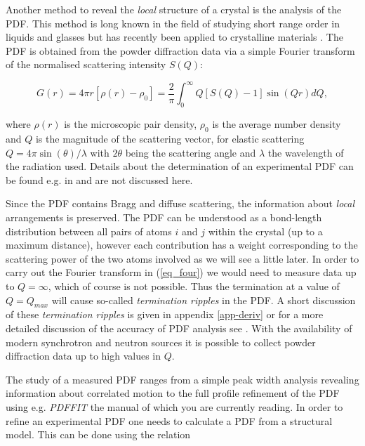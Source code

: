Another method to reveal the {\it local} structure of a crystal is
the analysis of the PDF. This method is long known in the field of
studying short range order in liquids and glasses but has recently
been applied to crystalline materials \citep{egami;lsfd98,bieg93}.
The PDF is obtained from the powder diffraction data via a simple
Fourier transform of the normalised scattering intensity $S(Q)$:

\begin{equation}
  G(r) = 4 \pi r [ \rho(r) - \rho_{0} ] =
         \frac{2}{\pi} \int_{0}^{\infty} Q [S(Q) - 1] \sin(Qr) dQ,
  \label{eq_four}
\end{equation}

\noindent where $\rho(r)$ is the microscopic pair density,
$\rho_{0}$ is the average number density and $Q$ is the magnitude
of the scattering vector, for elastic scattering $Q=4\pi \sin
(\theta) / \lambda$ with $2\theta$ being the scattering angle and
$\lambda$ the wavelength of the radiation used. Details about the
determination of an experimental PDF can be found e.g. in
\citet{egami;lsfd98,warren} and are not discussed here. \par

Since the PDF contains Bragg and diffuse scattering, the
information about {\it local} arrangements is preserved. The PDF
can be understood as a bond-length distribution between all pairs
of atoms $i$ and $j$ within the crystal (up to a maximum
distance), however each contribution has a weight corresponding to
the scattering power of the two atoms involved as we will see a
little later. In order to carry out the Fourier transform in
(\ref{eq_four}) we would need to measure data up to $Q=\infty$,
which of course is not possible. Thus the termination at a value
of $Q=Q_{max}$ will cause so-called {\it termination ripples} in
the PDF. A short discussion of these {\it termination ripples} is
given in appendix \ref{app-deriv} or for a more detailed
discussion of the accuracy of PDF analysis see \citet{toeg92}.
With the availability of modern synchrotron and neutron sources it
is possible to collect powder diffraction data up to high values
in $Q$. \par

The study of a measured PDF ranges from a simple peak width
analysis revealing information about correlated motion
\citep{jeprmjbi98} to the full profile refinement of the PDF using
e.g. {\it PDFFIT} the manual of which you are currently reading.
In order to refine an experimental PDF one needs to calculate a
PDF from a structural model. This can be done using the relation

